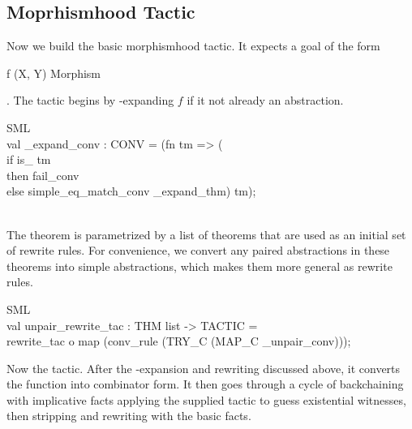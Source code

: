 \documentclass[11pt,a4paper]{article}
\begin{document}
\subsection{Moprhismhood Tactic}
Now we build the basic morphismhood tactic.
It expects a goal of the form
\begin{INLINEFT}%
\+f \PrIN{} (X, Y) Morphism\\
\end{INLINEFT}%
.
The tactic begins by \PrMI{}-expanding $f$ if it not already an abstraction.
\begin{GFT}{SML}
\+\\
\+val  \PrNL{}\PrMI{}\_expand\_conv\PrNN{} : CONV = (fn tm => (\\
\+	if	is\_\PrMM{} tm\\
\+	then	fail\_conv\\
\+	else	simple\_eq\_match\_conv \PrMI{}\_expand\_thm) tm);\\
\+\\
\end{GFT}
The theorem is parametrized by a list of theorems that are used
as an initial set of rewrite rules. For convenience, we convert
any paired abstractions in these theorems into simple abstractions,
which makes them more general as rewrite rules.
\begin{GFT}{SML}
\+\\
\+val \PrNL{}unpair\_rewrite\_tac\PrNN{} : THM list -> TACTIC = \\
\+	rewrite\_tac o map (conv\_rule (TRY\_C (MAP\_C \PrMM{}\_unpair\_conv)));\\
\end{GFT}
Now the tactic. After the \PrMI{}-expansion and rewriting discussed above,
it converts the function into combinator form.
It then goes through a cycle of backchaining with implicative facts
applying the supplied tactic to guess
existential witnesses, then stripping and rewriting with the basic facts.
\end{document}
